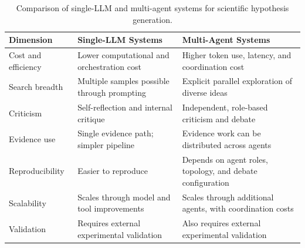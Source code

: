 \documentclass[11pt]{article}
\begin{document}
\begin{table}[htbp]
  \centering
  \caption{Comparison of single-LLM and multi-agent systems for scientific hypothesis generation.}
  \label{tab:system-comparison}
  \small
  \renewcommand{\arraystretch}{1.2}
  \begin{tabularx}{\textwidth}{@{}>{\raggedright\arraybackslash}p{}
                                  >{\raggedright\arraybackslash}X
                                  >{\raggedright\arraybackslash}X@{}}
    \toprule
    \textbf{Dimension} & \textbf{Single-LLM Systems} & \textbf{Multi-Agent Systems} \\
    \midrule
    Cost and efficiency & Lower computational and orchestration cost
                        & Higher token use, latency, and coordination cost \\
    Search breadth      & Multiple samples possible through prompting
                        & Explicit parallel exploration of diverse ideas \\
    Criticism           & Self-reflection and internal critique
                        & Independent, role-based criticism and debate \\
    Evidence use        & Single evidence path; simpler pipeline
                        & Evidence work can be distributed across agents \\
    Reproducibility     & Easier to reproduce
                        & Depends on agent roles, topology, and debate configuration \\
    Scalability         & Scales through model and tool improvements
                        & Scales through additional agents, with coordination costs \\
    Validation          & Requires external experimental validation
                        & Also requires external experimental validation \\
    \bottomrule
  \end{tabularx}
\end{table}
\end{document}
